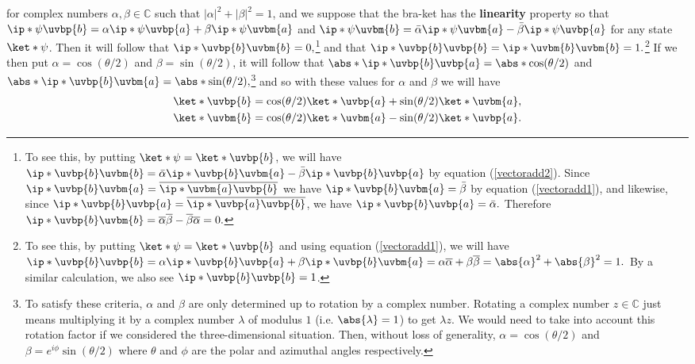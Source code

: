 \documentclass[12pt]{report}
\providecommand{\DIFadd}[1]{{\protect\color{blue}\uwave{#1}}} %
\providecommand{\DIFaddbegin}{} %
\providecommand{\DIFaddend}{} %
\begin{document}
for complex numbers $\alpha, \beta \in \mathbb{C}$ such that $|\alpha|^2+|\beta|^2=1$, and we suppose that the bra-ket has the \textbf{linearity}\label{linearity} property so that  $\ip*{\psi}{\uvbp{b}}=\alpha\ip*{\psi}{\uvbp{a}}+\beta\ip*{\psi}{\uvbm{a}}$ and $\ip*{\psi}{\uvbm{b}}=\bar{\alpha}\ip*{\psi}{\uvbm{a}}-\bar{\beta}\ip*{\psi}{\uvbp{a}}$ for any state $\ket*{\psi}$. Then  it will follow that  $\ip*{\uvbp{b}}{\uvbm{b}}=0,$\footnote{To see this, by putting $\ket*{\psi}=\ket*{\uvbp{b}}$, we will have $\ip*{\uvbp{b}}{\uvbm{b}}=\bar{\alpha}\ip*{\uvbp{b}}{\uvbm{a}}-\bar{\beta}\ip*{\uvbp{b}}{\uvbp{a}}$ by equation (\ref{vectoradd2}). Since  $\ip*{\uvbp{b}}{\uvbm{a}}=\overline{\ip*{\uvbm{a}}{\uvbp{b}}}$ we have $\ip*{\uvbp{b}}{\uvbm{a}}=\bar{\beta}$ by equation (\ref{vectoradd1}), and likewise, since $\ip*{\uvbp{b}}{\uvbp{a}}=\overline{\ip*{\uvbp{a}}{\uvbp{b}}}$, we have $\ip*{\uvbp{b}}{\uvbp{a}}=\bar{\alpha}.$  Therefore\DIFaddbegin \DIFadd{,  }\DIFaddend $\ip*{\uvbp{b}}{\uvbm{b}}=\overline{\alpha}\overline{\beta}-\overline{\beta}{\overline{\alpha}}=0.$}  and that $\ip*{\uvbp{b}}{\uvbp{b}}=\ip*{\uvbm{b}}{\uvbm{b}} = 1.$\footnote{To see this, by putting $\ket*{\psi}=\ket*{\uvbp{b}}$ and using equation (\ref{vectoradd1}), we will have $\ip*{\uvbp{b}}{\uvbp{b}}=\alpha\ip*{\uvbp{b}}{\uvbp{a}}+\beta\ip*{\uvbp{b}}{\uvbm{a}}=\alpha\overline{\alpha}+\beta\overline{\beta}=\abs{\alpha}^2+\abs{\beta}^2=1.$ By a similar calculation, we also see $\ip*{\uvbp{b}}{\uvbp{b}}=1$.}  
If we then put  $\alpha=\cos(\theta/2)$ and $\beta=\sin(\theta/2)$, it will follow that $\abs*{\ip*{\uvbp{b}}{\uvbp{a}}}=\abs*{\cos(\theta/2)}$ and  $\abs*{\ip*{\uvbp{b}}{\uvbm{a}}}=\abs*{\sin(\theta/2)},$\footnote{To satisfy these criteria, $\alpha$ and $\beta$ are only determined up to rotation by a complex number. Rotating a complex number $z\in\mathbb{C}$ just means multiplying it by a complex number $\lambda$ of modulus $1$ (i.e. $\abs{\lambda}=1$) to get $\lambda z$. We would need to take into account this rotation factor if we considered the three-dimensional situation. Then, without loss of generality, $\alpha=\cos(\theta/2)$ and $\beta=e^{i\phi}\sin(\theta/2)$ where $\theta$ and $\phi$ are the polar and azimuthal angles respectively.} and so with these values for $\alpha$ and $\beta$ we will have
\begin{subequations}\label{spintrans}
\begin{align}
\ket*{\uvbp{b}}&= \cos(\theta/2)\ket*{\uvbp{a}}+\sin(\theta/2) \ket*{\uvbm{a}},\label{spintrans1}\\
\ket*{\uvbm{b}}&= \cos(\theta/2)\ket*{\uvbm{a}}-\sin(\theta/2) \ket*{\uvbp{a}}.\label{spintrans2}
\end{align}
\end{subequations} 
\end{document}
